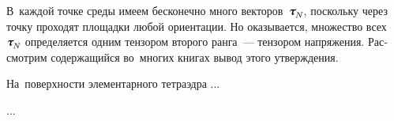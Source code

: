 \begin{otherlanguage}{russian}
В~каждой точке среды имеем бесконечно много векторов~${\cauchystress_{\hspace{-0.2ex}\raisemath{-0.1em}{N}}\hspace{-0.1ex}}$, поскольку через точку проходят площадки любой ориентации. Но оказывается, множество всех~${\cauchystress_{\hspace{-0.2ex}\raisemath{-0.1em}{N}}\hspace{-0.1ex}}$ определяется одним тензором второго ранга~--- тензором напряжения. Рассмотрим содержащийся во~многих книгах вывод этого утверждения.

На~поверхности элементарного тетраэдра ...

...



\end{otherlanguage}



\label{para:balanceinelasticcontinuum}

